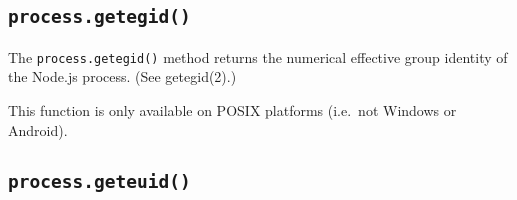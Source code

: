 \subsection{\texorpdfstring{\texttt{process.getegid()}}{process.getegid()}}\label{process.getegid}

The \texttt{process.getegid()} method returns the numerical effective
group identity of the Node.js process. (See getegid(2).)

\begin{Shaded}
\begin{Highlighting}[]
   \OperatorTok{;}

\NormalTok{ (}\NormalTok{) \{}
  \NormalTok{(}\SpecialCharTok{$\{}\NormalTok{()}\SpecialCharTok{\}}\VerbatimStringTok{\textasciigrave{}}\NormalTok{)}\OperatorTok{;}
\NormalTok{\}}
\end{Highlighting}
\end{Shaded}

\begin{Shaded}
\begin{Highlighting}[]
  \OperatorTok{=} \NormalTok{(}\NormalTok{)}\OperatorTok{;}

\NormalTok{ (}\NormalTok{) \{}
  \NormalTok{(}\SpecialCharTok{$\{}\NormalTok{()}\SpecialCharTok{\}}\VerbatimStringTok{\textasciigrave{}}\NormalTok{)}\OperatorTok{;}
\NormalTok{\}}
\end{Highlighting}
\end{Shaded}

This function is only available on POSIX platforms (i.e.~not Windows or
Android).

\subsection{\texorpdfstring{\texttt{process.geteuid()}}{process.geteuid()}}\label{process.geteuid}

